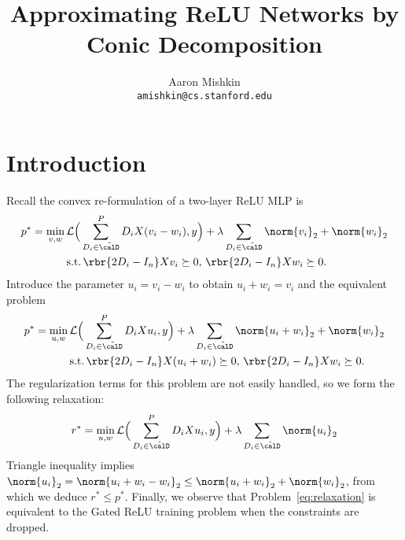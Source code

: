 \documentclass{article}
\title{Approximating ReLU Networks by Conic Decomposition}
\author{Aaron Mishkin\\ \texttt{amishkin@cs.stanford.edu}}
\date{}
\begin{document}
\maketitle

\section{Introduction}

Recall the convex re-formulation of a two-layer ReLU MLP is
\begin{equation}\label{eq:convex-relu-mlp}
	\begin{aligned}
		p^* = \min_{v, w} \, & \mathcal{L}\Big(  \sum_{D_i \in \tilde \calD}^P   D_i X (v_i  -  w_i), y\Big) + \lambda \sum_{D_i \in \tilde \calD} \norm{v_i}_2 + \norm{w_i}_2 \\
		                     & \text{s.t.} \, \rbr{2 D_i - I_n} X v_i \succeq 0, \, \rbr{2 D_i - I_n} X w_i \succeq 0.
	\end{aligned}
\end{equation}
Introduce the parameter \( u_i = v_i - w_i \) to obtain \( u_i + w_i = v_i \) and the equivalent problem
\begin{equation}\label{eq:reparameterized-problem}
	\begin{aligned}
		p^* = \min_{u, w} \, & \mathcal{L}\Big(  \sum_{D_i \in \tilde \calD}^P   D_i X u_i, y\Big) + \lambda \sum_{D_i \in \tilde \calD} \norm{u_i + w_i}_2 + \norm{w_i}_2 \\
		                     & \text{s.t.} \, \rbr{2 D_i - I_n} X (u_i + w_i) \succeq 0, \, \rbr{2 D_i - I_n} X w_i \succeq 0.
	\end{aligned}
\end{equation}
The regularization terms for this problem are not easily handled, so we form the following relaxation:
\begin{equation}\label{eq:relaxation}
	\begin{aligned}
		r^* = \min_{u, w} \, & \mathcal{L}\Big(  \sum_{D_i \in \tilde \calD}^P   D_i X u_i, y\Big) + \lambda \sum_{D_i \in \tilde \calD} \norm{u_i}_2 \\
	\end{aligned}
\end{equation}
Triangle inequality implies \( \norm{u_i}_2 = \norm{u_i + w_i - w_i}_2 \leq \norm{u_i + w_i}_2 + \norm{w_i}_2 \), from which we deduce \( r^* \leq p^* \).
Finally, we observe that Problem~\ref{eq:relaxation} is equivalent to the Gated ReLU training problem when the constraints are dropped.
\end{document}
